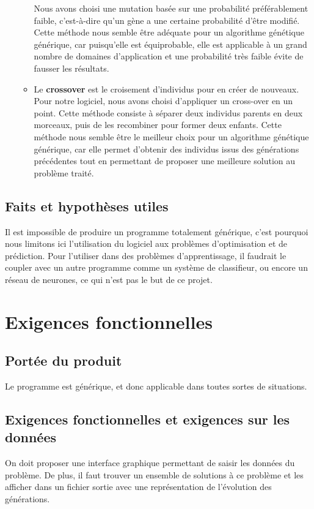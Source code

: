 \documentclass[a4paper,11pt]{article}
\begin{document}
\begin{itemize}
\begin{itemize}
				Nous avons choisi une mutation basée sur une probabilité préférablement faible, c'est-à-dire qu'un gène a une certaine probabilité d'être modifié. 
				Cette méthode nous semble être adéquate pour un algorithme génétique générique, car puisqu’elle est équiprobable, elle est applicable à un grand nombre de domaines d’application et une probabilité très faible 
				évite de fausser les résultats.
				\item Le \textbf{crossover} est le croisement d'individus pour en créer de nouveaux.
				Pour notre logiciel, nous avons choisi d’appliquer un cross-over en un point. 
				Cette méthode consiste à séparer deux individus parents en deux morceaux, puis de les recombiner pour former deux enfants.
				Cette méthode nous semble être le meilleur choix pour un algorithme génétique générique,
				car elle permet d’obtenir des individus issus des générations précédentes tout en permettant de proposer une meilleure solution au problème traité.
				
				

				

				
				\end{itemize}
			\end{itemize}
			
		\subsection{Faits et hypothèses utiles}
			Il est impossible de produire un programme totalement générique, c’est pourquoi nous limitons ici l’utilisation du logiciel aux problèmes d’optimisation et de prédiction. 
			Pour l’utiliser dans des problèmes d’apprentissage, il faudrait le coupler avec un autre programme comme un système de classifieur, ou encore un réseau de neurones, ce qui n’est pas le but de ce projet.
	\section{Exigences fonctionnelles}
		\subsection{Portée du produit}
			Le programme est générique, et donc applicable dans toutes sortes de situations.
		\subsection{Exigences fonctionnelles et exigences sur les données}
			On doit proposer une interface graphique permettant de saisir les données du problème. De plus, il faut trouver un ensemble de solutions à ce problème et les afficher dans un fichier sortie avec une représentation de l’évolution des générations.
			
\end{document}
